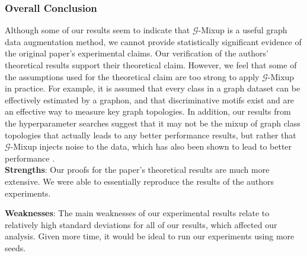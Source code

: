 \subsubsection*{Overall Conclusion} Although some of our results seem to indicate that $\mathcal{G}$-Mixup is a useful graph data augmentation method, we cannot provide statistically significant evidence of the original paper's experimental claims. Our verification of the authors' theoretical results support their theoretical claim. However, we feel that some of the assumptions used for the theoretical claim are too strong to apply $\mathcal{G}$-Mixup in practice. For example, it is assumed that every class in a graph dataset can be effectively estimated by a graphon, and that discriminative motifs exist and are an effective way to measure key graph topologies. In addition, our results from the hyperparameter searches suggest that it may not be the mixup of graph class topologies that actually leads to any better performance results, but rather that $\mathcal{G}$-Mixup injects noise to the data, which has also been shown to lead to better performance \cite{Grandvalet:1997}.
\\

\textbf{Strengths}: Our proofs for the paper's theoretical results are much more extensive. We were able to essentially reproduce the results of the authors experiments. 

\textbf{Weaknesses}: The main weaknesses of our experimental results relate to relatively high standard deviations for all of our results, which affected our analysis. Given more time, it would be ideal to run our experiments using more seeds.




